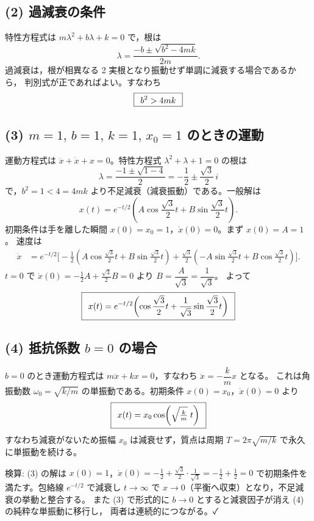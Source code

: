 \documentclass[11pt,a4paper]{article}
\begin{document}
\subsection*{(2) 過減衰の条件}
特性方程式は $m\lambda^2 + b\lambda + k = 0$ で，根は
\[
  \lambda = \frac{-b \pm \sqrt{b^2 - 4mk}}{2m}.
\]
過減衰は，根が相異なる 2 実根となり振動せず単調に減衰する場合であるから，
判別式が正であればよい。すなわち
\[
  \boxed{\,\;b^2 > 4mk\;\,}
\]

\subsection*{(3) $m=1,\,b=1,\,k=1,\,x_0=1$ のときの運動}
運動方程式は $\ddot x + \dot x + x = 0$。特性方程式 $\lambda^2+\lambda+1=0$ の根は
\[
  \lambda = \frac{-1\pm\sqrt{1-4}}{2} = -\frac{1}{2}\pm\frac{\sqrt3}{2}\,i
\]
で，$b^2=1<4=4mk$ より不足減衰（減衰振動）である。一般解は
\[
  x(t) = e^{-t/2}\!\left(A\cos\frac{\sqrt3}{2}t + B\sin\frac{\sqrt3}{2}t\right).
\]
初期条件は手を離した瞬間 $x(0)=x_0=1$，$\dot x(0)=0$。まず $x(0)=A=1$。
速度は
\begin{align*}
  \dot x &= e^{-t/2}\!\Big[-\tfrac{1}{2}\!\left(A\cos\tfrac{\sqrt3}{2}t+B\sin\tfrac{\sqrt3}{2}t\right)
            +\tfrac{\sqrt3}{2}\!\left(-A\sin\tfrac{\sqrt3}{2}t+B\cos\tfrac{\sqrt3}{2}t\right)\Big].
\end{align*}
$t=0$ で $\dot x(0)=-\tfrac{1}{2}A+\tfrac{\sqrt3}{2}B=0$ より $B=\dfrac{A}{\sqrt3}=\dfrac{1}{\sqrt3}$。
よって
\[
  \boxed{\,\;x(t) = e^{-t/2}\!\left(\cos\dfrac{\sqrt3}{2}t + \dfrac{1}{\sqrt3}\sin\dfrac{\sqrt3}{2}t\right)\;\,}
\]

\subsection*{(4) 抵抗係数 $b=0$ の場合}
$b=0$ のとき運動方程式は $m\ddot x + kx = 0$，すなわち $\ddot x = -\dfrac{k}{m}x$ となる。
これは角振動数 $\omega_0=\sqrt{k/m}$ の単振動である。初期条件 $x(0)=x_0$，$\dot x(0)=0$
より
\[
  \boxed{\,\;x(t) = x_0\cos\!\left(\sqrt{\tfrac{k}{m}}\;t\right)\;\,}
\]
すなわち減衰がないため振幅 $x_0$ は減衰せず，質点は周期
$T=2\pi\sqrt{m/k}$ で永久に単振動を続ける。

\medskip
検算: (3) の解は $x(0)=1$，$\dot x(0)=-\tfrac12+\tfrac{\sqrt3}{2}\cdot\tfrac{1}{\sqrt3}
=-\tfrac12+\tfrac12=0$ で初期条件を満たす。包絡線 $e^{-t/2}$ で減衰し
$t\to\infty$ で $x\to0$（平衡へ収束）となり，不足減衰の挙動と整合する。
また (3) で形式的に $b\to0$ とすると減衰因子が消え (4) の純粋な単振動に移行し，
両者は連続的につながる。✓
\end{document}
